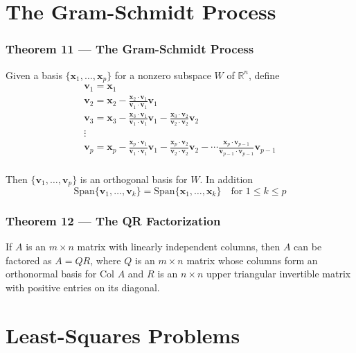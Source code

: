 \documentclass{article}
\begin{document}
\section*{The Gram-Schmidt Process}

\subsubsection*{Theorem 11 --- The Gram-Schmidt Process}
Given a basis $\{\mathbf{x}_1, \ldots, \mathbf{x}_p\}$ for a nonzero subspace $W$ of
$\mathbb{R}^n$, define
\[\begin{array}{l}
    \mathbf{v}_1 = \mathbf{x}_1 \\
    \mathbf{v}_2 = \mathbf{x}_2 - \frac{\mathbf{x}_2\cdot \mathbf{v}_1}{\mathbf{v}_1\cdot
    \mathbf{v}_1} \mathbf{v}_1 \\
    \mathbf{v}_3 = \mathbf{x}_3 - \frac{\mathbf{x}_3\cdot \mathbf{v}_1}{\mathbf{v}_1\cdot
    \mathbf{v}_1} \mathbf{v}_1 - \frac{\mathbf{x}_3\cdot \mathbf{v}_2}{\mathbf{v}_2\cdot
    \mathbf{v}_2} \mathbf{v}_2 \\
    \vdots \\
    \mathbf{v}_p = \mathbf{x}_p - \frac{\mathbf{x}_p\cdot \mathbf{v}_1}{\mathbf{v}_1\cdot
    \mathbf{v}_1} \mathbf{v}_1 - \frac{\mathbf{x}_p\cdot \mathbf{v}_2}{\mathbf{v}_2\cdot
    \mathbf{v}_2} \mathbf{v}_2 - \cdots \frac{\mathbf{x}_p\cdot \mathbf{v}_{p-1}}
    {\mathbf{v}_{p-1}\cdot \mathbf{v}_{p-1}} \mathbf{v}_{p-1} \\
\end{array}\]

Then $\{\mathbf{v}_1, \ldots, \mathbf{v}_p\}$ is an orthogonal basis for $W$. In addition
\[\text{Span}\{\mathbf{v}_1, \ldots, \mathbf{v}_k\} = \text{Span}\{\mathbf{x}_1, \ldots,
\mathbf{x}_k\}\quad \text{for } 1 \leq k \leq p\]

\subsubsection*{Theorem 12 --- The QR Factorization}
If $A$ is an $m\times n$ matrix with linearly independent columns, then $A$ can be factored as
$A=QR$, where $Q$ is an $m\times n$ matrix whose columns form an orthonormal basis for
$\text{Col } A$ and $R$ is an $n\times n$ upper triangular invertible matrix with positive entries
on its diagonal.

\pagebreak
\section*{Least-Squares Problems}
\end{document}
